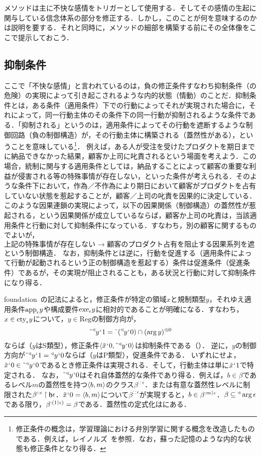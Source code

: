 メソッドは主に不快な感情をトリガーとして使用する．そしてその感情の生起に関与している信念体系の部分を修正する．しかし，このことが何を意味するのかは説明を要する．それと同時に，メソッドの細部を構築する前にその全体像をここで提示しておこう．

\subsection{抑制条件}
\label{ssec:抑制条件}

ここで「不快な感情」と言われているのは，負の修正条件すなわち抑制条件（の危険）の実現によって引き起こされるような内的状態（情動）のことだ．抑制条件とは，ある条件（適用条件）下での行動によってそれが実現された場合に，それによって，同一行動主体のその条件下の同一行動が抑制されるような条件である．「抑制される」というのは，適用条件によってその行動を遮断するような制御回路（負の制御構造）が，その行動主体に構築される（蓋然性がある），ということを意味している\footnote{修正条件の概念は，学習理論における弁別学習に関する概念を改造したものである．例えば，レイノルズ~\cite[pp.\,8--12]{レイノルズ}を参照．なお，蘇った記憶のような内的な状態も修正条件となり得る．}．
例えば，ある人が受注を受けたプロダクトを期日までに納品できなかった結果，顧客か上司に叱責されるという場面を考えよう．この場合，統制に関与する適用条件としては，納品することによって顧客の重要な利益が侵害される等の特殊事情が存在しない，といった条件が考えられる．そのような条件下において，作為／不作為により期日において顧客がプロダクトを占有していない状態を惹起することが，顧客／上司の叱責を因果的に決定している．
このような因果連鎖の実現によって，以下の因果関係（制御構造）の蓋然性が惹起される，という因果関係が成立しているならば，顧客か上司の叱責は，当該適用条件と行動に対して抑制条件になっている．すなわち，別の顧客に関するものでよいが，
\[
   \text{上記の特殊事情が存在しない → 顧客のプロダクト占有を阻止する因果系列を遮断}
\]
という制御構造．
なお，抑制条件とは逆に，行動を促進する（適用条件によって行動が起動されるという正の制御構造を惹起する）条件は促進条件（促進条件）であるが，その実現が阻止されることも，ある状況と行動に対して抑制条件になり得る．

foundation~\cite{foundation}の記法によると，修正条件が特定の領域$x$と規制類型$y$，それゆえ適用条件$\mathrm{app}_{\epsilon}y$や構成要件$\mathrm{exe}_{\epsilon}y$に相対的であることが明確になる．すなわち，$ x\in\mathrm{cty}_{\epsilon}y $について，$y\in\mathrm{Reg}$の制御方向が，
\[
    \tilde{\:\:}{^\triangleleft}y{\mspace{1mu}{`}\mspace{1mu}} 1 = \bar{\:\:}({^\triangleleft}y{\mspace{1mu}{`}\mspace{1mu}} 0)\cap(\arg y)^{\circledcirc 0}
\]
ならば（$y$はS類型），修正条件$ \langle \tilde{x}{\mspace{1mu}{`}\mspace{1mu}} 0,\tilde{\:\:}{^\triangleleft}y{\mspace{1mu}{`}\mspace{1mu}} 0 \rangle $は抑制条件である（）．
逆に，$ y $の制御方向が$\tilde{\:\:}{^\triangleleft}y{\mspace{1mu}{`}\mspace{1mu}} 1 = {^\triangleleft}y{\mspace{1mu}{`}\mspace{1mu}} 0 $ならば（$y$はP類型），促進条件である．
いずれにせよ，$ \tilde{x}{\mspace{1mu}{`}\mspace{1mu}} 0\in\tilde{\:\:}{^\triangleleft}y{\mspace{1mu}{`}\mspace{1mu}} 0 $であるとき修正条件は実現される．そして，行動主体は単に$\tilde{x}{\mspace{1mu}{`}\mspace{1mu}} 1$で特定される．
なお，$\tilde{\:\:}{^\triangleleft}y{\mspace{1mu}{`}\mspace{1mu}} 0$はそれ自体蓋然的な条件であり得る．例えば，$b\in\beta$であるレベル$m$の蓋然性を持つ$\langle b,m \rangle$のクラス$\beta^{::\epsilon}$．または有意な蓋然性レベルに制限された$\beta^{::\epsilon}\mathbin{\upharpoonright}\mathfrak{h}\epsilon$．$\tilde{x}{\mspace{1mu}{`}\mspace{1mu}} 0 = \langle b,m \rangle$について$\beta^{::\epsilon}$が実現すると，$b\in \beta^{:m\mathbin{\upharpoonleft}\epsilon}$．$ \beta\subseteq{^\triangleleft}\arg\epsilon $である限り，$ \beta^{:(1\mathbin{\upharpoonleft}\epsilon)}=\beta $である．蓋然性の定式化はにある．

